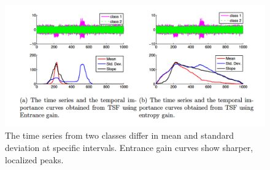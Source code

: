 \begin{figure}[h]
\centering
\includegraphics[width=\linewidth]{res/importanceCurvesTwo.png}
\caption{The time series from two classes differ in mean and standard deviation at specific intervals. Entrance gain curves show sharper, localized peaks.}
\label{fig:tempTwo}
\end{figure}
